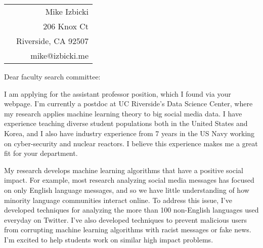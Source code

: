 \documentclass[12pt]{article}
\begin{document}
\noindent
\hspace{-0.13in}
\begin{tabularx}{1.03\textwidth}{Xr}
 & Mike Izbicki \\
 & 206 Knox Ct\\
 & Riverside, CA 92507\\
 & mike@izbicki.me\\
\end{tabularx}

\vspace{0.2in}

\setlength{\parskip}{15pt plus4mm minus3mm}

\noindent
Dear faculty search committee:

\noindent
I am applying for the assistant professor position,
which I found via your webpage.
I'm currently a postdoc at UC Riverside's Data Science Center,
where my research applies machine learning theory to big social media data.
I have experience teaching diverse student populations both in the United States and Korea,
and I also have industry experience from 7 years in the US Navy working on cyber-security and nuclear reactors.
I believe this experience makes me a great fit for your department.

\noindent
My research develops machine learning algorithms that have a positive social impact.
For example, most research analyzing social media messages has focused on only English language messages,
and so we have little understanding of how minority language communities interact online.
To address this issue, I've developed techniques for analyzing the more than 100 non-English languages used everyday on Twitter.
I've also developed techniques to prevent malicious users from corrupting machine learning algorithms with racist messages or fake news.
I'm excited to help students work on similar high impact problems.
\end{document}
